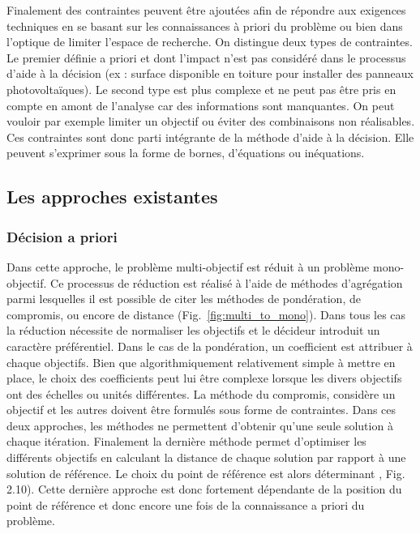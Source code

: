 Finalement des contraintes peuvent être ajoutées afin de répondre aux exigences
techniques en se basant sur les connaissances à priori du problème ou bien dans
l’optique de limiter l’espace de recherche. On distingue deux types de contraintes.
Le premier définie a priori et dont l’impact n’est pas considéré dans le processus
d’aide à la décision (ex : surface disponible en toiture pour installer des
panneaux photovoltaïques).
Le second type est plus complexe et ne peut pas être pris en compte en amont de
l’analyse car des informations sont manquantes. On peut vouloir par exemple limiter
un objectif ou éviter des combinaisons non réalisables. Ces contraintes sont donc
parti intégrante de la méthode d’aide à la décision.
Elle peuvent s’exprimer sous la forme de bornes, d’équations ou inéquations.




\subsection{Les approches existantes} %
\label{sub:les_approches_existantes}
\subsubsection{Décision a priori} %
\label{ssub:decision_a_priori}
Dans cette approche, le problème multi-objectif est réduit à un problème mono-objectif.
Ce processus de réduction est réalisé à l’aide de méthodes d’agrégation parmi lesquelles
il est possible de citer les méthodes de pondération, de compromis,
ou encore de distance (Fig.~\ref{fig:multi_to_mono}). Dans tous les cas la réduction
nécessite de normaliser les objectifs et le décideur introduit un caractère préférentiel.
Dans le cas de la pondération, un coefficient est attribuer à chaque objectifs. Bien que
algorithmiquement relativement simple à mettre en place, le choix des coefficients peut
lui être complexe lorsque les divers objectifs ont des échelles ou unités différentes.
La méthode du compromis, considère un objectif et les autres doivent être formulés
sous forme de contraintes.
Dans ces deux approches, les méthodes ne permettent d’obtenir qu’une seule
solution à chaque itération.
Finalement la dernière méthode permet d’optimiser les différents objectifs en calculant
la distance de chaque solution par rapport à une solution de référence. Le choix
du point de référence est alors déterminant \parencite{Collette2002}, Fig. 2.10).
Cette dernière approche est donc fortement dépendante de la position du point de
référence et donc encore une fois de la connaissance a priori du problème.


